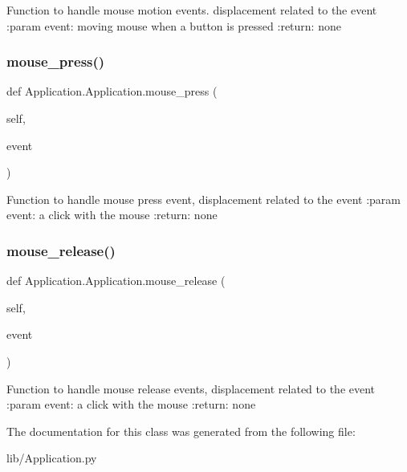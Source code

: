 \begin{DoxyVerb}Function to handle mouse motion events. displacement related to the event
:param event: moving mouse when a button is pressed
:return: none
\end{DoxyVerb}
 \mbox{\label{class_application_1_1_application_ab71deae47ac8b52b81ca833c5fdd3da0}} 
\subsubsection{mouse\+\_\+press()}
{\footnotesize\ttfamily def Application.\+Application.\+mouse\+\_\+press (\begin{DoxyParamCaption}\item[{}]{self,  }\item[{}]{event }\end{DoxyParamCaption})}

\begin{DoxyVerb}Function to handle mouse press event, displacement related to the event
:param event: a click with the mouse
:return: none\end{DoxyVerb}
 \mbox{\label{class_application_1_1_application_a239b47672cfb2b3e71302d0536a54e82}} 
\subsubsection{mouse\+\_\+release()}
{\footnotesize\ttfamily def Application.\+Application.\+mouse\+\_\+release (\begin{DoxyParamCaption}\item[{}]{self,  }\item[{}]{event }\end{DoxyParamCaption})}

\begin{DoxyVerb}Function to handle mouse release events, displacement related to the event
:param event: a click with the mouse
:return: none
\end{DoxyVerb}
 

The documentation for this class was generated from the following file\+:\begin{DoxyCompactItemize}
\item 
lib/Application.\+py\end{DoxyCompactItemize}
